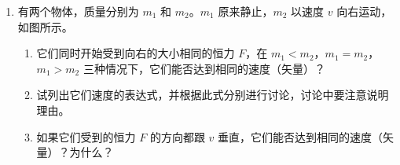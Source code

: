 \documentclass[\gkver]{gaokaozhenti}
\begin{document}
\begin{enumerate}
{（2）BC 间发生了断路。

理由：此时的等效电路如图所示，D 向右移动 $R_{1}$ 增大，AD 间的电阻 $R_{\mathrm{AD}}=\frac{R_{1}R_{3}}{R_{1}+R_{3}}$ 也增大，其中 $R_{3}=R+R_{G}$；$R_{G}$ 是电流计内电阻，同时 $R_{2}$ 减小。于是加在 AD 间的电压 $U_{\mathrm{AD}}=\frac{R_{\mathrm{AD}}E}{R_{\mathrm{AD}}+R_{2}}=\frac{E}{1+\frac{R_{2}}{R_{\mathrm{AD}}}}$


也增大，这就使流过电流计 G 的电流增大。

评分说明：全题 14 分。（1）8 分，（2）6 分。

（1）中，步骤①2 分，未写“按下 K”，或未写“按下 D，观察 G 中指针偏转方向”的，各扣 1 分；步骤②3 分，在按下 D 时未写“直到 G 的指针不偏转”的不给分，漏写按下 D 的，扣 1 分；步骤③1 分；步骤④2 分，未写 $R_{x}=\frac{l_{2}}{l_{1}}R$ 的，不给分。$l_{1}$，$l_{2}$ 用 AD、DC 表示也可以。如果步骤①的全部或部分内容与步骤②合并写出，不因此而扣分。

（2）中，写出断路位置，给 2 分，说明理由，给 4 分。理由的说明中，只写出 $R_{\mathrm{AD}}$ 随 D 的右移而增大的，给 2 分。用分压原理说明了随 D 的右移 AD 间的电压增大，因而流过 G 的电流增大的，给 4 分。说明理由中，只要基本点都已说到，无概念错误，但叙述层次不清、文句不够通顺的，这次考试暂不扣分，明显的概念错误可酌情扣分。
}

\item
有两个物体，质量分别为 $m_{1}$ 和 $m_{2}$。$m_{1}$ 原来静止，$m_{2}$ 以速度 $v$ 向右运动，如图所示。
\begin{enumerate}
	\item
	它们同时开始受到向右的大小相同的恒力 $F$，在 $m_{1}<m_{2}$，$m_{1}=m_{2}$，$m_{1}>m_{2}$ 三种情况下，它们能否达到相同的速度（矢量）？
	\item
	试列出它们速度的表达式，并根据此式分别进行讨论，讨论中要注意说明理由。
	\item
	如果它们受到的恒力 $F$ 的方向都跟 $v$ 垂直，它们能否达到相同的速度（矢量）？为什么？
\end{enumerate}
\onepicture[align=right, w=5cm]{}

\end{enumerate}
\end{document}
